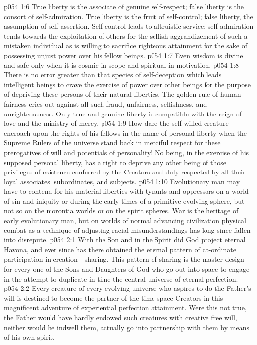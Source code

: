 \vs p054 1:6 True liberty is the associate of genuine self\hyp{}respect; false liberty is the consort of self\hyp{}admiration. True liberty is the fruit of self\hyp{}control; false liberty, the assumption of self\hyp{}assertion. Self\hyp{}control leads to altruistic service; self\hyp{}admiration tends towards the exploitation of others for the selfish aggrandizement of such a mistaken individual as is willing to sacrifice righteous attainment for the sake of possessing unjust power over his fellow beings.
\pc \vs p054 1:7 Even wisdom is divine and safe only when it is cosmic in scope and spiritual in motivation.
\pc \vs p054 1:8 There is no error greater than that species of self\hyp{}deception which leads intelligent beings to crave the exercise of power over other beings for the purpose of depriving these persons of their natural liberties. The golden rule of human fairness cries out against all such fraud, unfairness, selfishness, and unrighteousness. Only true and genuine liberty is compatible with the reign of love and the ministry of mercy.
\vs p054 1:9 How dare the self\hyp{}willed creature encroach upon the rights of his fellows in the name of personal liberty when the Supreme Rulers of the universe stand back in merciful respect for these prerogatives of will and potentials of personality! No being, in the exercise of his supposed personal liberty, has a right to deprive any other being of those privileges of existence conferred by the Creators and duly respected by all their loyal associates, subordinates, and subjects.
\vs p054 1:10 Evolutionary man may have to contend for his material liberties with tyrants and oppressors on a world of sin and iniquity or during the early times of a primitive evolving sphere, but not so on the morontia worlds or on the spirit spheres. War is the heritage of early evolutionary man, but on worlds of normal advancing civilization physical combat as a technique of adjusting racial misunderstandings has long since fallen into disrepute.
\vs p054 2:1 With the Son and in the Spirit did God project eternal Havona, and ever since has there obtained the eternal pattern of co\hyp{}ordinate participation in creation---sharing. This pattern of sharing is the master design for every one of the Sons and Daughters of God who go out into space to engage in the attempt to duplicate in time the central universe of eternal perfection.
\vs p054 2:2 Every creature of every evolving universe who aspires to do the Father’s will is destined to become the partner of the time\hyp{}space Creators in this magnificent adventure of experiential perfection attainment. Were this not true, the Father would have hardly endowed such creatures with creative free will, neither would he indwell them, actually go into partnership with them by means of his own spirit.
